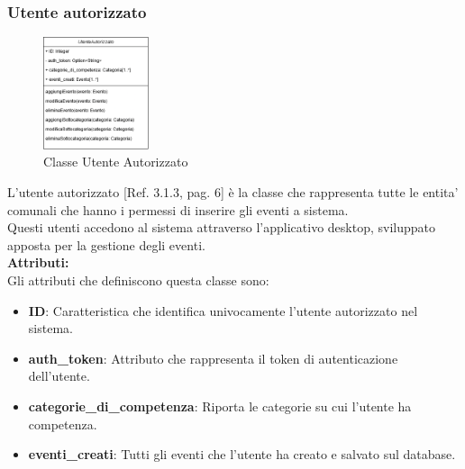 \documentclass{article}
\begin{document}
\clearpage

\subsubsection{Utente autorizzato}

\begin{figure}[htbp]
    \centering
    \includegraphics[width=0.275\textwidth]{Images/utenteAutorizzato_class.png}
    \caption{Classe Utente Autorizzato}
    \label{fig:utente_autorizzato}
\end{figure}

L'utente autorizzato [Ref. 3.1.3, pag. 6] è la classe che rappresenta tutte le entita' comunali che hanno i permessi di inserire gli eventi a sistema.\\
Questi utenti accedono al sistema attraverso l'applicativo desktop, sviluppato apposta per la gestione degli eventi.\\

\textbf{Attributi:}\\
Gli attributi che definiscono questa classe sono:
\begin{itemize}
    \item \textbf{ID}: Caratteristica che identifica univocamente l'utente autorizzato nel sistema.
    \item \textbf{auth\_token}: Attributo che rappresenta il token di autenticazione dell'utente.
    \item \textbf{categorie\_di\_competenza}: Riporta le categorie su cui l'utente ha competenza.
    \item \textbf{eventi\_creati}: Tutti gli eventi che l'utente ha creato e salvato sul database.
\end{itemize}
\end{document}
